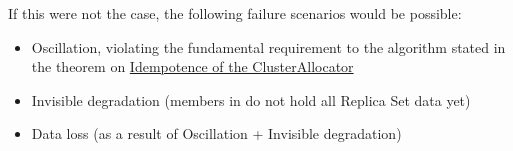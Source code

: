 If this were not the case, the following failure scenarios would be possible:
\begin{itemize}
  \item Oscillation, violating the fundamental requirement to the algorithm stated in the theorem on \hyperref[theorem:idempotence_clusterallocator]{Idempotence of the ClusterAllocator}
  \item Invisible degradation (members in  do not hold all Replica Set data yet)
  \item Data loss (as a result of Oscillation + Invisible degradation)
\end{itemize}
